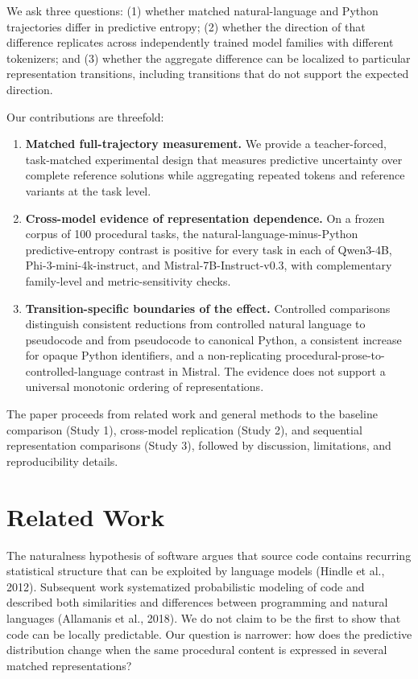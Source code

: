 \documentclass[sn-mathphys-num]{sn-jnl}
\begin{document}
We ask three questions: (1) whether matched natural-language and Python trajectories differ in predictive entropy; (2) whether the direction of that difference replicates across independently trained model families with different tokenizers; and (3) whether the aggregate difference can be localized to particular representation transitions, including transitions that do not support the expected direction.

Our contributions are threefold:

\begin{enumerate}
\item \textbf{Matched full-trajectory measurement.} We provide a teacher-forced, task-matched experimental design that measures predictive uncertainty over complete reference solutions while aggregating repeated tokens and reference variants at the task level.
\item \textbf{Cross-model evidence of representation dependence.} On a frozen corpus of 100 procedural tasks, the natural-language-minus-Python predictive-entropy contrast is positive for every task in each of Qwen3-4B, Phi-3-mini-4k-instruct, and Mistral-7B-Instruct-v0.3, with complementary family-level and metric-sensitivity checks.
\item \textbf{Transition-specific boundaries of the effect.} Controlled comparisons distinguish consistent reductions from controlled natural language to pseudocode and from pseudocode to canonical Python, a consistent increase for opaque Python identifiers, and a non-replicating procedural-prose-to-controlled-language contrast in Mistral. The evidence does not support a universal monotonic ordering of representations.
\end{enumerate}

The paper proceeds from related work and general methods to the baseline comparison (Study 1), cross-model replication (Study 2), and sequential representation comparisons (Study 3), followed by discussion, limitations, and reproducibility details.

\section{Related Work}

The naturalness hypothesis of software argues that source code contains recurring statistical structure that can be exploited by language models (Hindle et al., 2012). Subsequent work systematized probabilistic modeling of code and described both similarities and differences between programming and natural languages (Allamanis et al., 2018). We do not claim to be the first to show that code can be locally predictable. Our question is narrower: how does the predictive distribution change when the same procedural content is expressed in several matched representations?
\end{document}
